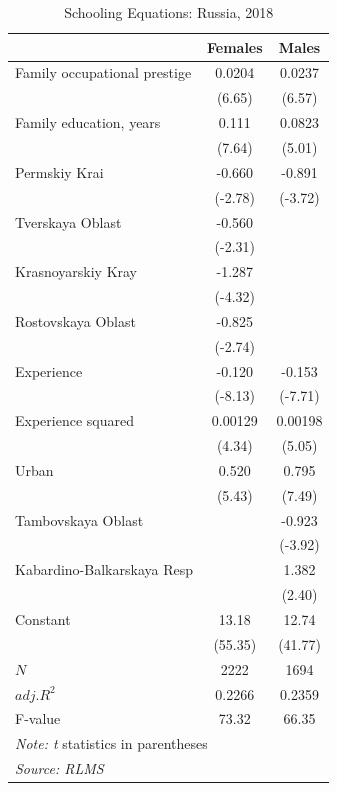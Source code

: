 \documentclass[alpha-refs]{wiley-article-01g}
\begin{document}
\begin{table}[h!]\centering
	\caption{Schooling Equations: Russia, 2018}
	\label{tab:6.1}
	\begin{tabular}{l*{2}{c}}
		\hline\hline
		&\multicolumn{1}{c}{Females}&\multicolumn{1}{c}{Males}\\
		\hline
		Family occupational prestige &   0.0204&   0.0237\\
		&   (6.65)&   (6.57)\\
		Family education, years &    0.111&   0.0823\\
		&   (7.64)&   (5.01)\\
		Permskiy Krai&   -0.660&   -0.891\\
		&  (-2.78)&  (-3.72)\\
		Tverskaya Oblast&   -0.560&         \\
		&  (-2.31)&         \\
		Krasnoyarskiy Kray&   -1.287&         \\
		&  (-4.32)&         \\
		Rostovskaya Oblast&   -0.825&         \\
		&  (-2.74)&         \\
		Experience     &   -0.120&   -0.153\\
		&  (-8.13)&  (-7.71)\\
		Experience squared    &  0.00129&  0.00198\\
		&   (4.34)&   (5.05)\\
		Urban     &    0.520&    0.795\\
		&   (5.43)&   (7.49)\\
		Tambovskaya Oblast&         &   -0.923\\
		&         &  (-3.92)\\
		Kabardino-Balkarskaya Resp&         &    1.382\\
		&         &   (2.40)\\
		Constant    &    13.18&    12.74\\
		&  (55.35)&  (41.77)\\
		\hline
		\(N\)     &     2222&     1694\\
		\(adj. R^{2}\)&   0.2266      &   0.2359      \\
		F-value &    73.32     &   66.35      \\
		\hline\hline
		\multicolumn{3}{l}{\footnotesize \textit{Note: t} statistics in parentheses}\\
		\multicolumn{3}{l}{\footnotesize  \textit{Source: RLMS}}\\
	\end{tabular}
\end{table}
\end{document}
